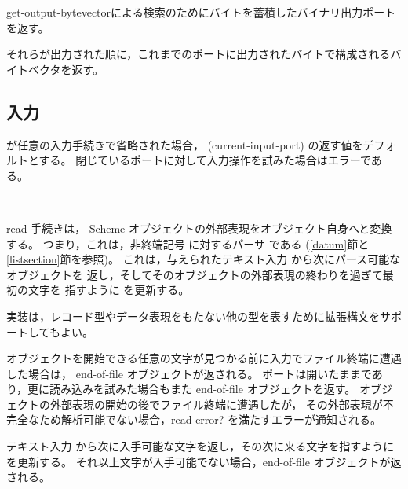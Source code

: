 \begin{entry}{%
}

{\cf get-output-bytevector}による検索のためにバイトを蓄積したバイナリ出力ポートを返す。

\end{entry}

\begin{entry}{%
}

それらが出力された順に，これまでのポートに出力されたバイトで構成されるバイトベクタを返す。
\end{entry}


\subsection{入力}
\label{inputsection}

 が任意の入力手続きで省略された場合， {\cf (current-input-port)} の返す値をデフォルトとする。
閉じているポートに対して入力操作を試みた場合はエラーである。

\noindent \hbox{ }  %
\vspace{-5ex}


\begin{entry}{%
}

{\cf read} 手続きは， Scheme オブジェクトの外部表現をオブジェクト自身へと変換する。
つまり，これは，非終端記号  に対するパーサ
である (\ref{datum}節と\ref{listsection}節を参照)。
これは，与えられたテキスト入力  から次にパース可能なオブジェクトを
返し，そしてそのオブジェクトの外部表現の終わりを過ぎて最初の文字を
指すように  を更新する。

実装は，レコード型やデータ表現をもたない他の型を表すために拡張構文をサポートしてもよい。

\vest オブジェクトを開始できる任意の文字が見つかる前に入力でファイル終端に遭遇した場合は，
end-of-file オブジェクトが返される。
ポートは開いたままであり，更に読み込みを試みた場合もまた end-of-file オブジェクトを返す。
オブジェクトの外部表現の開始の後でファイル終端に遭遇したが，
その外部表現が不完全なため解析可能でない場合，{\cf read-error?} を満たすエラーが通知される。

\end{entry}

\begin{entry}{%
}

テキスト入力  から次に入手可能な文字を返し，その次に来る文字を指すように  を更新する。
それ以上文字が入手可能でない場合，end-of-file オブジェクトが返される。

\end{entry}


